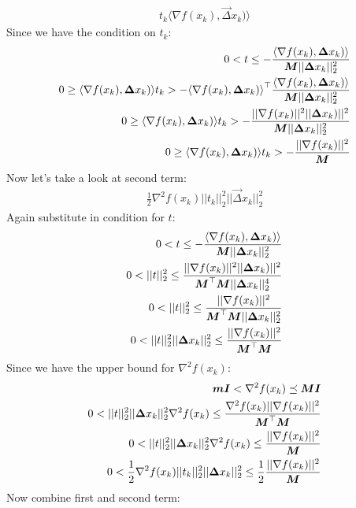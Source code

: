 \documentclass[12pt,twoside]{article}
\begin{document}
\begin{enumerate}[a)]
\begin{align}
t_k\langle\nabla f(x_k), \vec{\Delta}x_k)\rangle
\end{align}
Since we have the condition on $t_k$:
\begin{align}
0 < t \leq - \frac{\langle\nabla f(x_k), {\boldsymbol{{\Delta}}}x_k)\rangle}{{\boldsymbol{{M}}} ||{\boldsymbol{{\Delta}}} x_k||_2^2}\\
0 \geq {\langle\nabla f(x_k), {\boldsymbol{{\Delta}}}x_k)\rangle}t_k > -{\langle\nabla f(x_k), {\boldsymbol{{\Delta}}}x_k)\rangle}^\top \frac{\langle\nabla f(x_k), {\boldsymbol{{\Delta}}}x_k)\rangle}{{\boldsymbol{{M}}} ||{\boldsymbol{{\Delta}}} x_k||_2^2}\\
0 \geq {\langle\nabla f(x_k), {\boldsymbol{{\Delta}}}x_k)\rangle}t_k > -\frac{||\nabla f(x_k)||^2 ||{\boldsymbol{{\Delta}}}x_k)||^2}{{\boldsymbol{{M}}} ||{\boldsymbol{{\Delta}}} x_k||_2^2}\\
0 \geq {\langle\nabla f(x_k), {\boldsymbol{{\Delta}}}x_k)\rangle}t_k > -\frac{||\nabla f(x_k)||^2}{{\boldsymbol{{M}}}}
\end{align}
Now let's take a look at second term:
\begin{align}
\frac{1}{2}\nabla^2 f(x_k)||t_k||_2^2||\vec{\Delta}x_k||_2^2
\end{align}
Again substitute in condition for $t$:
\begin{align}
0 < t \leq - \frac{\langle\nabla f(x_k), {\boldsymbol{{\Delta}}}x_k)\rangle}{{\boldsymbol{{M}}} ||{\boldsymbol{{\Delta}}} x_k||_2^2}\\
0 < ||t||_2^2 \leq \frac{||\nabla f(x_k)||^2 ||{\boldsymbol{{\Delta}}}x_k)||^2}{{\boldsymbol{{M}}}^\top {\boldsymbol{{M}}} ||{\boldsymbol{{\Delta}}} x_k||_2^4}\\
0 <  ||t||_2^2 \leq \frac{||\nabla f(x_k)||^2}{{\boldsymbol{{M}}}^\top {\boldsymbol{{M}}} ||{\boldsymbol{{\Delta}}} x_k||_2^2}\\
0 <  ||t||_2^2 ||{\boldsymbol{{\Delta}}}x_k||_2^2 \leq \frac{||\nabla f(x_k)||^2}{{\boldsymbol{{M}}}^\top {\boldsymbol{{M}}}}\\
\end{align}
Since we have the upper bound for $\nabla^2 f(x_k)$:
\begin{align}
{\boldsymbol{{mI}}} <  \nabla^2 f(x_k) \preceq {\boldsymbol{{MI}}}\\
0 <  ||t||_2^2 ||{\boldsymbol{{\Delta}}}x_k||_2^2 \nabla^2 f(x_k) \leq \frac{\nabla^2 f(x_k) ||\nabla f(x_k)||^2}{{\boldsymbol{{M}}}^\top {\boldsymbol{{M}}}}\\
0 < ||t||_2^2 ||{\boldsymbol{{\Delta}}}x_k||_2^2 \nabla^2 f(x_k) \leq \frac{||\nabla f(x_k)||^2}{{\boldsymbol{{M}}}}\\
0 < \frac{1}{2}\nabla^2 f(x_k)||t_k||_2^2||{\boldsymbol{{\Delta}}}x_k||_2^2 \leq \frac{1}{2} \frac{||\nabla f(x_k)||^2}{{\boldsymbol{{M}}}}
\end{align}
Now combine first and second term:
\begin{align}

\end{align}
\end{enumerate}
\end{document}
